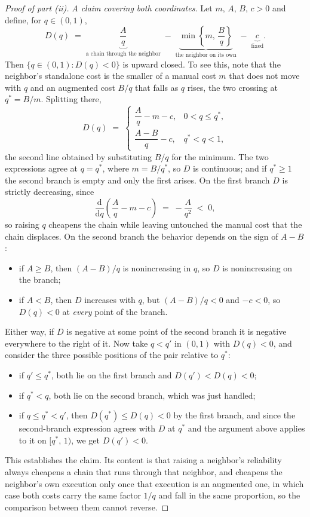 \begin{proof}[Proof of part (ii)]
\emph{A claim covering both coordinates.}
Let $m,\, A,\, B,\, c > 0$ and define, for $q \in (0,1)$,
\[ D(q) \;=\; \underbrace{\frac{A}{q}}_{\text{a chain through the neighbor}} \;-\; \underbrace{\min\left\{ m,\, \frac{B}{q} \right\}}_{\text{the neighbor on its own}} \;-\; \underbrace{c}_{\text{fixed}} . \]
Then $\{ q \in (0,1) : D(q) < 0 \}$ is upward closed.
To see this, note that the neighbor's standalone cost is the smaller of a manual cost $m$ that does not move with $q$ and an augmented cost $B/q$ that falls as $q$ rises, the two crossing at $q^{*} = B/m$.
Splitting there,
\[
D(q) \;=\;
\begin{cases}
\dfrac{A}{q} - m - c, & 0 < q \leq q^{*}, \\[2.2ex]
\dfrac{A - B}{q} - c, & q^{*} < q < 1,
\end{cases}
\]
the second line obtained by substituting $B/q$ for the minimum.
The two expressions agree at $q = q^{*}$, where $m = B/q^{*}$, so $D$ is continuous; and if $q^{*} \geq 1$ the second branch is empty and only the first arises.
On the first branch $D$ is strictly decreasing, since
\[ \frac{\mathrm{d}}{\mathrm{d}q}\left( \frac{A}{q} - m - c \right) \;=\; -\frac{A}{q^{2}} \;<\; 0 , \]
so raising $q$ cheapens the chain while leaving untouched the manual cost that the chain displaces.
On the second branch the behavior depends on the sign of $A - B$:
\begin{itemize}
\item if $A \geq B$, then $(A-B)/q$ is nonincreasing in $q$, so $D$ is nonincreasing on the branch;
\item if $A < B$, then $D$ increases with $q$, but $(A-B)/q < 0$ and $-c < 0$, so $D(q) < 0$ at \emph{every} point of the branch.
\end{itemize}
Either way, if $D$ is negative at some point of the second branch it is negative everywhere to the right of it.
Now take $q < q'$ in $(0,1)$ with $D(q) < 0$, and consider the three possible positions of the pair relative to $q^{*}$:
\begin{itemize}
\item if $q' \leq q^{*}$, both lie on the first branch and $D(q') < D(q) < 0$;
\item if $q^{*} < q$, both lie on the second branch, which was just handled;
\item if $q \leq q^{*} < q'$, then $D(q^{*}) \leq D(q) < 0$ by the first branch, and since the second-branch expression agrees with $D$ at $q^{*}$ and the argument above applies to it on $[q^{*},\, 1)$, we get $D(q') < 0$.
\end{itemize}
This establishes the claim.
Its content is that raising a neighbor's reliability always cheapens a chain that runs through that neighbor, and cheapens the neighbor's own execution only once that execution is an augmented one, in which case both costs carry the same factor $1/q$ and fall in the same proportion, so the comparison between them cannot reverse.


\end{proof}
